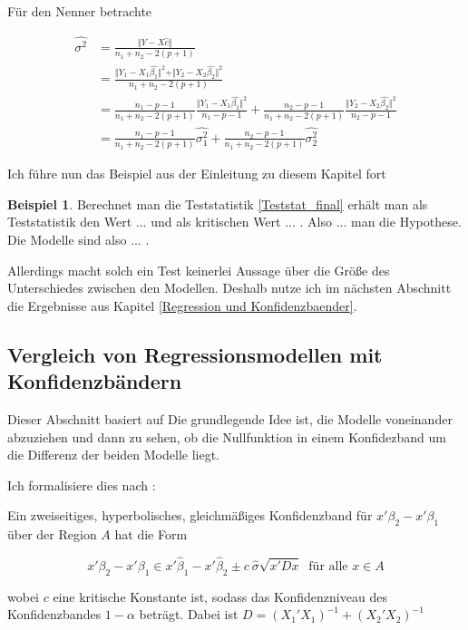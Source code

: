 \documentclass[12pt,a4paper]{article}
\theoremstyle{definition}
\newtheorem{Beispiel}[Definition]{Beispiel}
\theoremstyle{definition}
\theoremstyle{definition}
\begin{document}
Für den Nenner betrachte

\begin{align*}
\widehat{\sigma^2}  &= \frac{\Vert Y-X \hat{c} \Vert}{n_1 + n_2 - 2(p+1)} \\
				&= \frac{\Vert Y_1 - X_1 \hat{\beta_1} \Vert^2 + \Vert Y_2 - X_2 \hat{\beta_2} \Vert^2}{n_1+n_2-2(p+1)} \\
				&= \frac{n_1-p-1}{n_1+n_2-2(p+1)} \frac{\Vert Y_1 - X_1 \hat{\beta_1} \Vert^2}{n_1-p-1}+ \frac{n_2-p-1}{n_1+n_2-2(p+1)} \frac{\Vert Y_2 - X_2 \hat{\beta_2} \Vert^2}{n_2-p-1} \\
				&= \frac{n_1-p-1}{n_1+n_2-2(p+1)} \hat{\sigma_{1}^2}+ \frac{n_2-p-1}{n_1+n_2-2(p+1)} \hat{\sigma_{2}^2}
\end{align*}

Ich führe nun das Beispiel aus der Einleitung zu diesem Kapitel fort

\begin{Beispiel}
Berechnet man die Teststatistik \eqref{Teststat_final} erhält man als Teststatistik den Wert ... und als kritischen Wert ... . Also ... man die Hypothese. Die Modelle sind also ... .
\end{Beispiel}

Allerdings macht solch ein Test keinerlei Aussage über die Größe des Unterschiedes zwischen den Modellen. Deshalb nutze ich im nächsten Abschnitt die Ergebnisse aus Kapitel \ref{Regression und Konfidenzbaender}.


\subsection{Vergleich von Regressionsmodellen mit Konfidenzbändern}
\label{Konfidenzbaender vergleich}
Dieser Abschnitt basiert auf \cite[119-121]{Liu64}
Die grundlegende Idee ist, die Modelle voneinander abzuziehen und dann zu sehen, ob die Nullfunktion in einem Konfidezband um die Differenz der beiden Modelle liegt.

Ich formalisiere dies nach \cite[122]{Liu64}: 

Ein zweiseitiges, hyperbolisches, gleichmäßiges Konfidenzband für $x'\beta_2 - x'\beta_1$ über der Region $A$ hat die Form

\begin{equation} \label{Vergleich-KB}
x'\beta_2-x'\beta_1 \in x' \hat{\beta}_1 - x' \hat{\beta}_2 \pm c ~ \hat{\sigma} \sqrt{x' D x} ~ \text{ für alle } x \in A
\end{equation}

wobei $c$ eine kritische Konstante ist, sodass das Konfidenzniveau des Konfidenzbandes $1-\alpha$ beträgt. Dabei ist $D = (X_1'X_1)^{-1} + (X_2'X_2)^{-1}$
\end{document}
